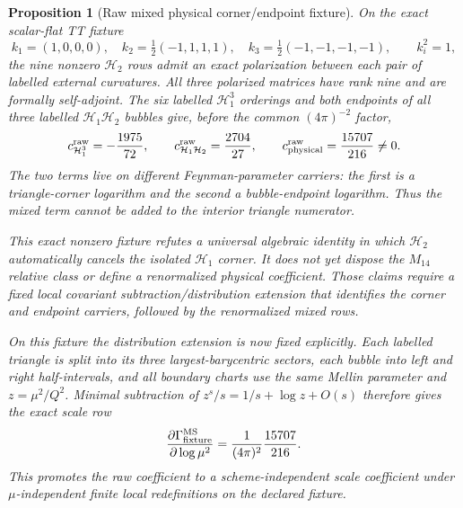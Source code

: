 \documentclass[11pt]{article}
\newtheorem{proposition}[theorem]{Proposition}
\theoremstyle{definition}
\theoremstyle{remark}
\begin{document}
\begin{proposition}[Raw mixed physical corner/endpoint fixture]
On the exact scalar-flat TT fixture
\[
 k_1=(1,0,0,0),\quad
 k_2=\tfrac12(-1,1,1,1),\quad
 k_3=\tfrac12(-1,-1,-1,-1),
 \qquad k_i^2=1,
\]
the nine nonzero $\mathcal H_2$ rows admit an exact polarization between
each pair of labelled external curvatures.  All three polarized matrices
have rank nine and are formally self-adjoint.  The six labelled
$\mathcal H_1^3$ orderings and both endpoints of all three labelled
$\mathcal H_1\mathcal H_2$ bubbles give, before the common $(4\pi)^{-2}$
factor,
\[
 c^{\rm raw}_{\mathcal H_1^3}=-\frac{1975}{72},\qquad
 c^{\rm raw}_{\mathcal H_1\mathcal H_2}=\frac{2704}{27},\qquad
 c^{\rm raw}_{\rm physical}=\frac{15707}{216}\ne0.
\]
The two terms live on different Feynman-parameter carriers: the first is a
triangle-corner logarithm and the second a bubble-endpoint logarithm.  Thus
the mixed term cannot be added to the interior triangle numerator.

This exact nonzero fixture refutes a universal algebraic identity in which
$\mathcal H_2$ automatically cancels the isolated $\mathcal H_1$ corner.
It does not yet dispose the $M_{14}$ relative class or define a renormalized
physical coefficient.  Those claims require a fixed local covariant
subtraction/distribution extension that identifies the corner and endpoint
carriers, followed by the renormalized mixed rows.

On this fixture the distribution extension is now fixed explicitly.  Each
labelled triangle is split into its three largest-barycentric sectors, each
bubble into left and right half-intervals, and all boundary charts use the
same Mellin parameter and $z=\mu^2/Q^2$.  Minimal subtraction of
$z^s/s=1/s+\log z+O(s)$ therefore gives the exact scale row
\[
 \frac{\partial\Gamma_{\rm fixture}^{\rm MS}}
      {\partial\log\mu^2}
 =\frac1{(4\pi)^2}\frac{15707}{216}.
\]
This promotes the raw coefficient to a scheme-independent scale coefficient
under $\mu$-independent finite local redefinitions on the declared fixture.


\end{proposition}
\end{document}
